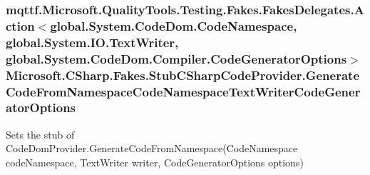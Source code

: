 \hypertarget{class_microsoft_1_1_c_sharp_1_1_fakes_1_1_stub_c_sharp_code_provider_af47a15900921a7459a210c7af7b5d0a5}{
\subsubsection[{Generate\-Code\-From\-Namespace\-Code\-Namespace\-Text\-Writer\-Code\-Generator\-Options}]{\setlength{\rightskip}{0pt plus 5cm}mqttf.\-Microsoft.\-Quality\-Tools.\-Testing.\-Fakes.\-Fakes\-Delegates.\-Action$<$global.\-System.\-Code\-Dom.\-Code\-Namespace, global.\-System.\-I\-O.\-Text\-Writer, global.\-System.\-Code\-Dom.\-Compiler.\-Code\-Generator\-Options$>$ Microsoft.\-C\-Sharp.\-Fakes.\-Stub\-C\-Sharp\-Code\-Provider.\-Generate\-Code\-From\-Namespace\-Code\-Namespace\-Text\-Writer\-Code\-Generator\-Options}}\label{class_microsoft_1_1_c_sharp_1_1_fakes_1_1_stub_c_sharp_code_provider_af47a15900921a7459a210c7af7b5d0a5}


Sets the stub of Code\-Dom\-Provider.\-Generate\-Code\-From\-Namespace(\-Code\-Namespace code\-Namespace, Text\-Writer writer, Code\-Generator\-Options options)

